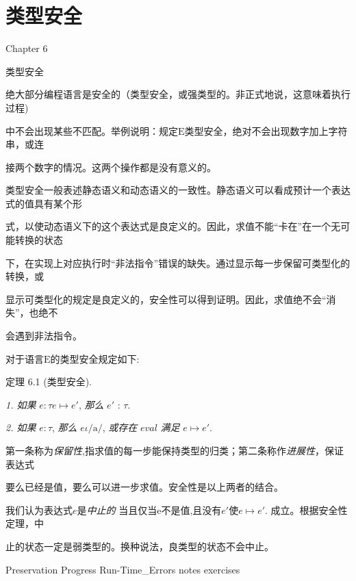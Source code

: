 \chapter{类型安全}%
Chapter 6

类型安全

绝大部分编程语言是安全的（类型安全，或强类型的。非正式地说，这意味着执行过程)%

中不会出现某些不匹配。举例说明：规定$\mathrm{E}$类型安全，绝对不会出现数字加上字符串，或连

接两个数字的情况。这两个操作都是没有意义的。%

类型安全一般表述静态语义和动态语义的一致性。静态语义可以看成预计一个表达式的值具有某个形%

式，以使动态语义下的这个表达式是良定义的。因此，求值不能“卡在”在一个无可能转换的状态%

下，在实现上对应执行时“非法指令”错误的缺失。通过显示每一步保留可类型化的转换，或

显示可类型化的规定是良定义的，安全性可以得到证明。因此，求值绝不会“消失”，也绝不

会遇到非法指令。

对于语言$\mathrm{E}$的类型安全规定如下:

定理 6.1 (类型安全).%

{\it 1. 如果} $e:\tau  e\mapsto e'$, {\it 那么} $e'$ : $\tau.$%

{\it 2. 如果} $ e:\tau$, {\it 那么} $e\iota/\mathrm{a}/$, {\it 或存在} $e val$ {\it 满足} $e\mapsto e'.$%

第一条称为{\it 保留性},指求值的每一步能保持类型的归类；第二条称作{\it 进展性}，保证表达式

要么已经是值，要么可以进一步求值。安全性是以上两者的结合。

我们认为表达式$e$是{\it 中止的} 当且仅当e不是值,且没有$e'$使$e\mapsto e'$. 成立。根据安全性定理，中%

止的状态一定是弱类型的。换种说法，良类型的状态不会中止。

{Preservation}
{Progress}
{Run-Time_Errors}
{notes}
{exercises}












